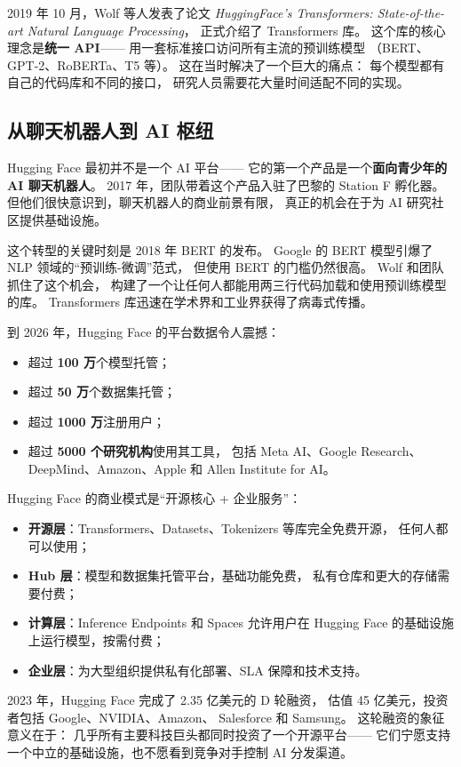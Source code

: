 2019 年 10 月，Wolf 等人发表了论文
\textit{HuggingFace's Transformers: State-of-the-art Natural Language Processing}，
正式介绍了 Transformers 库。
这个库的核心理念是\textbf{统一 API}——
用一套标准接口访问所有主流的预训练模型
（BERT、GPT-2、RoBERTa、T5 等）。
这在当时解决了一个巨大的痛点：
每个模型都有自己的代码库和不同的接口，
研究人员需要花大量时间适配不同的实现。

\subsection{从聊天机器人到 AI 枢纽}

Hugging Face 最初并不是一个 AI 平台——
它的第一个产品是一个\textbf{面向青少年的 AI 聊天机器人}。
2017 年，团队带着这个产品入驻了巴黎的 Station F 孵化器。
但他们很快意识到，聊天机器人的商业前景有限，
真正的机会在于为 AI 研究社区提供基础设施。

这个转型的关键时刻是 2018 年 BERT 的发布。
Google 的 BERT 模型引爆了 NLP 领域的``预训练-微调''范式，
但使用 BERT 的门槛仍然很高。
Wolf 和团队抓住了这个机会，
构建了一个让任何人都能用两三行代码加载和使用预训练模型的库。
Transformers 库迅速在学术界和工业界获得了病毒式传播。

到 2026 年，Hugging Face 的平台数据令人震撼：

\begin{itemize}[noitemsep]
  \item 超过 \textbf{100 万}个模型托管；
  \item 超过 \textbf{50 万}个数据集托管；
  \item 超过 \textbf{1000 万}注册用户；
  \item 超过 \textbf{5000 个研究机构}使用其工具，
    包括 Meta AI、Google Research、DeepMind、Amazon、Apple
    和 Allen Institute for AI。
\end{itemize}

\begin{corebox}
Hugging Face 的商业模式是``开源核心 + 企业服务''：
\begin{itemize}
  \item \textbf{开源层}：Transformers、Datasets、Tokenizers 等库完全免费开源，
    任何人都可以使用；
  \item \textbf{Hub 层}：模型和数据集托管平台，基础功能免费，
    私有仓库和更大的存储需要付费；
  \item \textbf{计算层}：Inference Endpoints 和 Spaces
    允许用户在 Hugging Face 的基础设施上运行模型，按需付费；
  \item \textbf{企业层}：为大型组织提供私有化部署、SLA 保障和技术支持。
\end{itemize}
2023 年，Hugging Face 完成了 2.35 亿美元的 D 轮融资，
估值 45 亿美元，投资者包括 Google、NVIDIA、Amazon、
Salesforce 和 Samsung。
这轮融资的象征意义在于：
几乎所有主要科技巨头都同时投资了一个开源平台——
它们宁愿支持一个中立的基础设施，也不愿看到竞争对手控制 AI 分发渠道。
\end{corebox}

